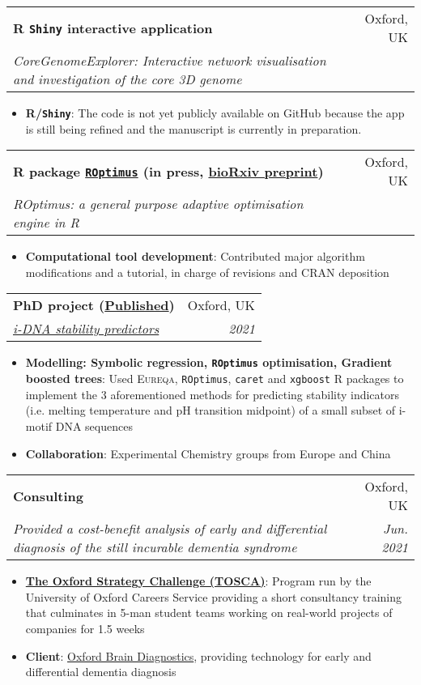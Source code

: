 \documentclass[legalpaper,11pt]{article}
\makeatletter
\newcommand{\resumeItem}[2]{
  \item\small{
    \textbf{#1}{: #2 \vspace{-2pt}}
  }
}
\newcommand{\resumeSubheading}[4]{
  \vspace{-1pt}\item
    \begin{tabular*}{0.97\textwidth}[t]{l@{\extracolsep{\fill}}r}
      \textbf{#1} & #2 \\
      \textit{\small#3} & \textit{\small #4} \\
    \end{tabular*}\vspace{-5pt}
}
\newcommand{\resumeItemListStart}{\begin{itemize}}
\newcommand{\resumeItemListEnd}{\end{itemize}\vspace{-5pt}}
\makeatother
\begin{document}
     \resumeSubheading
      {R \texttt{Shiny} interactive application}{Oxford, UK}
      {CoreGenomeExplorer: Interactive network visualisation and investigation of the core 3D genome}{}
      \resumeItemListStart
        \resumeItem{R/\texttt{Shiny}}
          {The code is not yet publicly available on GitHub because the app is still being refined and the manuscript is currently in preparation.}
     \resumeItemListEnd

     \resumeSubheading
      {R package \href{https://cran.r-project.org/web/packages/ROptimus/index.html}{\texttt{ROptimus}} (in press, \href{https://www.biorxiv.org/content/10.1101/2022.01.18.476810v1}{bioRxiv preprint})}{Oxford, UK}
      {ROptimus: a general purpose adaptive optimisation engine in R}{}
      \resumeItemListStart
        \resumeItem{Computational tool development}
          {Contributed major algorithm modifications and a tutorial, in charge of revisions and CRAN deposition} %
     \resumeItemListEnd
     
     \resumeSubheading
      {PhD project (\href{https://doi.org/10.1002/anie.202016801}{Published})}{Oxford, UK}
      {\href{https://github.com/SahakyanLab/iMotif_dev}{i-DNA stability predictors}}{2021}
      \resumeItemListStart
        \resumeItem{Modelling: Symbolic regression, \texttt{ROptimus} optimisation, Gradient boosted trees}
          {Used \textsc{Eureqa}, \texttt{ROptimus}, \texttt{caret} and \texttt{xgboost} R packages to implement the 3 aforementioned methods for predicting stability indicators (i.e. melting temperature and pH transition midpoint) of a small subset of i-motif DNA sequences}
          \resumeItem{Collaboration}{Experimental Chemistry groups from Europe and China}
     \resumeItemListEnd

     \resumeSubheading
      {Consulting}{Oxford, UK}
      {Provided a cost-benefit analysis of early and differential diagnosis of the still incurable dementia syndrome}{Jun. 2021}
      \resumeItemListStart
        \resumeItem{\href{https://www.careers.ox.ac.uk/oxford-strategy-challenge}{The Oxford Strategy Challenge (TOSCA)}}
          {Program run by the University of Oxford Careers Service providing a short consultancy training that culminates in 5-man student teams working on real-world projects of companies for 1.5 weeks}
        \resumeItem{Client}
          {\href{https://www.oxfordbraindiagnostics.com/}{Oxford Brain Diagnostics}, providing technology for early and differential dementia diagnosis}
      \resumeItemListEnd
\end{document}
